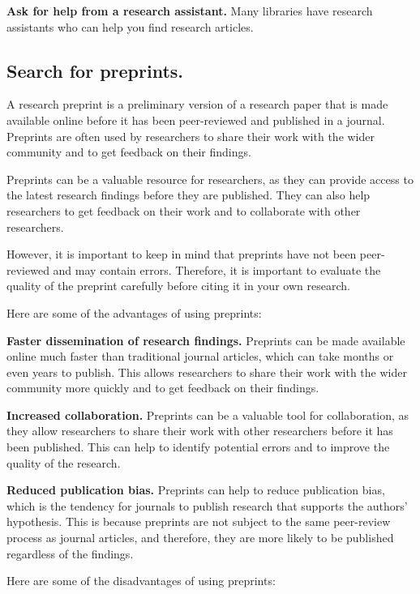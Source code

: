 \documentclass[
  b5paper]{book}
\begin{document}
\textbf{Ask for help from a research assistant.} Many libraries have research assistants who can help you find research articles.

\hypertarget{search-for-preprints.}{%
\subsection*{Search for preprints.}\label{search-for-preprints.}}

A research preprint is a preliminary version of a research paper that is made available online before it has been peer-reviewed and published in a journal. Preprints are often used by researchers to share their work with the wider community and to get feedback on their findings.

Preprints can be a valuable resource for researchers, as they can provide access to the latest research findings before they are published. They can also help researchers to get feedback on their work and to collaborate with other researchers.

However, it is important to keep in mind that preprints have not been peer-reviewed and may contain errors. Therefore, it is important to evaluate the quality of the preprint carefully before citing it in your own research.

Here are some of the advantages of using preprints:

\textbf{Faster dissemination of research findings.} Preprints can be made available online much faster than traditional journal articles, which can take months or even years to publish. This allows researchers to share their work with the wider community more quickly and to get feedback on their findings.

\textbf{Increased collaboration.} Preprints can be a valuable tool for collaboration, as they allow researchers to share their work with other researchers before it has been published. This can help to identify potential errors and to improve the quality of the research.

\textbf{Reduced publication bias.} Preprints can help to reduce publication bias, which is the tendency for journals to publish research that supports the authors' hypothesis. This is because preprints are not subject to the same peer-review process as journal articles, and therefore, they are more likely to be published regardless of the findings.

Here are some of the disadvantages of using preprints:
\end{document}
